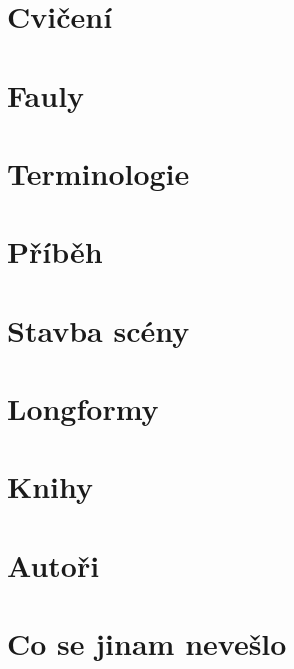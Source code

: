 \documentclass[a4paper,10pt,openany]{book}
\begin{document}
\chapter{Cvičení}


\chapter{Fauly}\label{fauly}

\label{:kategorie:fauly}



\chapter{Terminologie}\label{terminologie}
\label{:kategorie:terminologie}


\chapter{Příběh}



\chapter{Stavba scény}



\chapter{Longformy}\label{longformy}




\chapter{Knihy}\label{knihy}



\chapter{Autoři}\label{autori}


\chapter{Co se jinam nevešlo}\label{co se jinam nevešlo}

\end{document}
